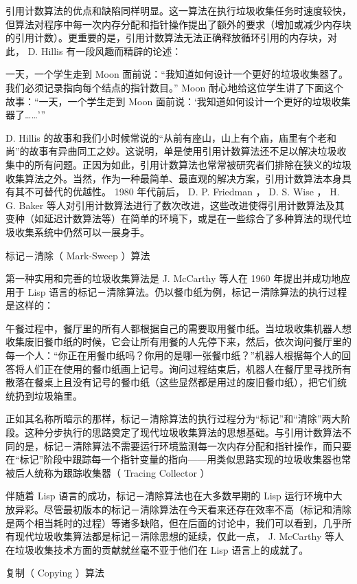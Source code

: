 \documentclass[a4paper, 11pt]{article}
\begin{document}
引用计数算法的优点和缺陷同样明显。这一算法在执行垃圾收集任务时速度较快，但算法对程序中每一次内存分配和指针操作提出了额外的要求（增加或减少内存块的引用计数）。更重要的是，引用计数算法无法正确释放循环引用的内存块，对此， D. Hillis 有一段风趣而精辟的论述：

一天，一个学生走到 Moon 面前说：“我知道如何设计一个更好的垃圾收集器了。我们必须记录指向每个结点的指针数目。” Moon 耐心地给这位学生讲了下面这个故事：“一天，一个学生走到 Moon 面前说：‘我知道如何设计一个更好的垃圾收集器了……’”

D. Hillis 的故事和我们小时候常说的“从前有座山，山上有个庙，庙里有个老和尚”的故事有异曲同工之妙。这说明，单是使用引用计数算法还不足以解决垃圾收集中的所有问题。正因为如此，引用计数算法也常常被研究者们排除在狭义的垃圾收集算法之外。当然，作为一种最简单、最直观的解决方案，引用计数算法本身具有其不可替代的优越性。 1980 年代前后， D. P. Friedman ， D. S. Wise ， H. G. Baker 等人对引用计数算法进行了数次改进，这些改进使得引用计数算法及其变种（如延迟计数算法等）在简单的环境下，或是在一些综合了多种算法的现代垃圾收集系统中仍然可以一展身手。

标记－清除（ Mark-Sweep ）算法

第一种实用和完善的垃圾收集算法是 J. McCarthy 等人在 1960 年提出并成功地应用于 Lisp 语言的标记－清除算法。仍以餐巾纸为例，标记－清除算法的执行过程是这样的：

午餐过程中，餐厅里的所有人都根据自己的需要取用餐巾纸。当垃圾收集机器人想收集废旧餐巾纸的时候，它会让所有用餐的人先停下来，然后，依次询问餐厅里的每一个人：“你正在用餐巾纸吗？你用的是哪一张餐巾纸？”机器人根据每个人的回答将人们正在使用的餐巾纸画上记号。询问过程结束后，机器人在餐厅里寻找所有散落在餐桌上且没有记号的餐巾纸（这些显然都是用过的废旧餐巾纸），把它们统统扔到垃圾箱里。

正如其名称所暗示的那样，标记－清除算法的执行过程分为“标记”和“清除”两大阶段。这种分步执行的思路奠定了现代垃圾收集算法的思想基础。与引用计数算法不同的是，标记－清除算法不需要运行环境监测每一次内存分配和指针操作，而只要在“标记”阶段中跟踪每一个指针变量的指向——用类似思路实现的垃圾收集器也常被后人统称为跟踪收集器（ Tracing Collector ）

伴随着 Lisp 语言的成功，标记－清除算法也在大多数早期的 Lisp 运行环境中大放异彩。尽管最初版本的标记－清除算法在今天看来还存在效率不高（标记和清除是两个相当耗时的过程）等诸多缺陷，但在后面的讨论中，我们可以看到，几乎所有现代垃圾收集算法都是标记－清除思想的延续，仅此一点， J. McCarthy 等人在垃圾收集技术方面的贡献就丝毫不亚于他们在 Lisp 语言上的成就了。

复制（ Copying ）算法
\end{document}

